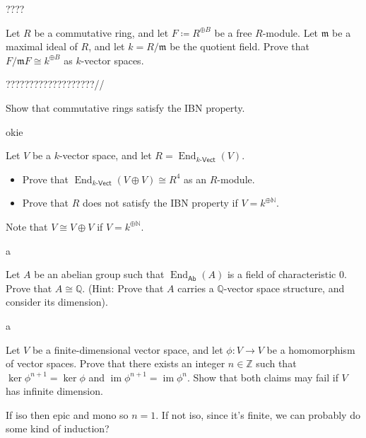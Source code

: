 \documentclass[11pt]{report}
\DeclareMathOperator{\End}{End}
\DeclareMathOperator{\im}{im}
\newcommand{\Vect}[1]{#1\text{-}\mathsf{Vect}}
\begin{document}
\begin{solution}
	????
\end{solution}
\begin{exercise}
	Let $R$ be a commutative ring, and let $F\coloneqq R^{\oplus B} $ be a free $R$-module. Let $\mathfrak{m} $ be a maximal ideal of $R$, and let $k=R/\mathfrak{m} $ be the quotient field. Prove that $F/\mathfrak{m} F\cong k^{\oplus B} $ as $k$-vector spaces.
\end{exercise}
\begin{solution}
	???????????????????//
\end{solution}
\begin{exercise}
	Show that commutative rings satisfy the IBN property.
\end{exercise}
\begin{solution}
	okie
\end{solution}
\begin{exercise}
	Let $V$ be a $k$-vector space, and let $R=\End_{\Vect{k} }(V) $.
	\begin{itemize}
		\item Prove that $\End_{\Vect{k} }(V\oplus V) \cong R^4$ as an $R$-module.
		\item Prove that $R$ does not satisfy the IBN property if $V=k^{\oplus \mathbb{N} } $.
	\end{itemize}
Note that $V\cong V\oplus V$ if $V=k^{\oplus \mathbb{N} } $.
\end{exercise}
\begin{solution}
	a
\end{solution}
\begin{exercise}
	Let $A$ be an abelian group such that $\End_{\mathsf{Ab} }(A) $ is a field of characteristic 0. Prove that $A\cong \mathbb{Q}$. (Hint: Prove that $A$ carries a $\mathbb{Q} $-vector space structure, and consider its dimension).
\end{exercise}
\begin{solution}
	a
\end{solution}
\begin{exercise}
	Let $V$ be a finite-dimensional vector space, and let $\phi : V \to V$ be a homomorphism of vector spaces. Prove that there exists an integer $n\in\mathbb{Z} $ such that $\ker \phi ^{n+1} =\ker \phi $ and $\im \phi ^{n+1} =\im \phi ^{n} $. Show that both claims may fail if $V$ has infinite dimension.
\end{exercise}
\begin{solution}
	If iso then epic and mono so $n=1$. If not iso, since it's finite, we can probably do some kind of induction?
\end{solution}
\end{document}

